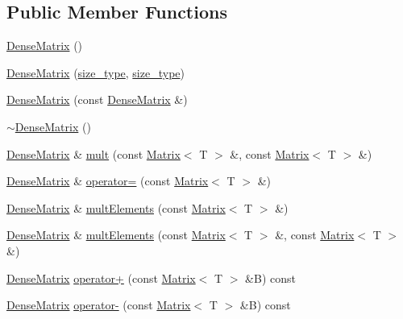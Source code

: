\subsection*{Public Member Functions}
\begin{DoxyCompactItemize}
\item 
\hyperlink{classlmx_1_1DenseMatrix_ada75efeb7bf6c5220f1f7e718fe3311b}{Dense\-Matrix} ()
\item 
\hyperlink{classlmx_1_1DenseMatrix_a240cb7ac78e3d1e29d65e08060dccf5a}{Dense\-Matrix} (\hyperlink{lmx__mat__data_8h_a49b489a408a211a90e766329c0732d7b}{size\-\_\-type}, \hyperlink{lmx__mat__data_8h_a49b489a408a211a90e766329c0732d7b}{size\-\_\-type})
\item 
\hyperlink{classlmx_1_1DenseMatrix_a34e6c5c76b6b6f729a745c48a4ce78a9}{Dense\-Matrix} (const \hyperlink{classlmx_1_1DenseMatrix}{Dense\-Matrix} \&)
\item 
\hyperlink{classlmx_1_1DenseMatrix_a8b7a868fe29aa399d104cf46213158fb}{$\sim$\-Dense\-Matrix} ()
\item 
\hyperlink{classlmx_1_1DenseMatrix}{Dense\-Matrix} \& \hyperlink{classlmx_1_1DenseMatrix_aea3df37602013fd216dc9a895f71d7b5}{mult} (const \hyperlink{classlmx_1_1Matrix}{Matrix}$<$ T $>$ \&, const \hyperlink{classlmx_1_1Matrix}{Matrix}$<$ T $>$ \&)
\item 
\hyperlink{classlmx_1_1DenseMatrix}{Dense\-Matrix} \& \hyperlink{classlmx_1_1DenseMatrix_abc141337e70e9fee9c56bc4966705f76}{operator=} (const \hyperlink{classlmx_1_1Matrix}{Matrix}$<$ T $>$ \&)
\item 
\hyperlink{classlmx_1_1DenseMatrix}{Dense\-Matrix} \& \hyperlink{classlmx_1_1DenseMatrix_a2ecef4d0da9409fe1f02f0bcadf78222}{mult\-Elements} (const \hyperlink{classlmx_1_1Matrix}{Matrix}$<$ T $>$ \&)
\item 
\hyperlink{classlmx_1_1DenseMatrix}{Dense\-Matrix} \& \hyperlink{classlmx_1_1DenseMatrix_a13fbcfd9a36eda49d800ea4f75226223}{mult\-Elements} (const \hyperlink{classlmx_1_1Matrix}{Matrix}$<$ T $>$ \&, const \hyperlink{classlmx_1_1Matrix}{Matrix}$<$ T $>$ \&)
\item 
\hyperlink{classlmx_1_1DenseMatrix}{Dense\-Matrix} \hyperlink{classlmx_1_1DenseMatrix_a2b27d8130aea5d145ec83d81e346e6b1}{operator+} (const \hyperlink{classlmx_1_1Matrix}{Matrix}$<$ T $>$ \&B) const 
\item 
\hyperlink{classlmx_1_1DenseMatrix}{Dense\-Matrix} \hyperlink{classlmx_1_1DenseMatrix_a1a80039a17afadbcf71529ddf4324ccc}{operator-\/} (const \hyperlink{classlmx_1_1Matrix}{Matrix}$<$ T $>$ \&B) const 

\end{DoxyCompactItemize}
